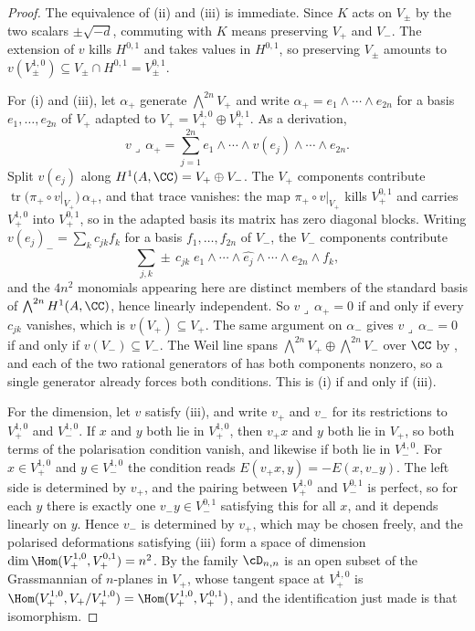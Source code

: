 \begin{proof}
The equivalence of (ii) and (iii) is immediate. Since $K$ acts on $V_{\pm}$
by the two scalars $\pm\sqrt{-d}$, commuting with $K$ means preserving $V_{+}$
and $V_{-}$. The extension of $v$ kills $H^{0,1}$ and takes values in
$H^{0,1}$, so preserving $V_{\pm}$ amounts to
$v(V_{\pm}^{1,0})\subseteq V_{\pm}\cap H^{0,1}=V_{\pm}^{0,1}$.

For (i) and (iii), let $\alpha_{+}$ generate $\bigwedge^{2n}V_{+}$ and write
$\alpha_{+}=e_{1}\wedge\cdots\wedge e_{2n}$ for a basis $e_{1},\dots,e_{2n}$
of $V_{+}$ adapted to $V_{+}=V_{+}^{1,0}\oplus V_{+}^{0,1}$. As a derivation,
\[
  v\lrcorner\,\alpha_{+}
  =\sum_{j=1}^{2n}e_{1}\wedge\cdots\wedge v(e_{j})\wedge\cdots\wedge e_{2n}.
\]
Split $v(e_{j})$ along $H^{1}(A,\CC)=V_{+}\oplus V_{-}$. The $V_{+}$
components contribute
$\operatorname{tr}\bigl(\pi_{+}\circ v|_{V_{+}}\bigr)\,\alpha_{+}$, and that
trace vanishes: the map $\pi_{+}\circ v|_{V_{+}}$ kills $V_{+}^{0,1}$ and
carries $V_{+}^{1,0}$ into $V_{+}^{0,1}$, so in the adapted basis its matrix
has zero diagonal blocks. Writing
$v(e_{j})_{-}=\sum_{k}c_{jk}f_{k}$ for a basis $f_{1},\dots,f_{2n}$ of
$V_{-}$, the $V_{-}$ components contribute
\[
  \sum_{j,k}\pm\,c_{jk}\;
  e_{1}\wedge\cdots\wedge\widehat{e_{j}}\wedge\cdots\wedge e_{2n}\wedge f_{k},
\]
and the $4n^{2}$ monomials appearing here are distinct members of the
standard basis of $\bigwedge^{2n}H^{1}(A,\CC)$, hence linearly independent.
So $v\lrcorner\,\alpha_{+}=0$ if and only if every $c_{jk}$ vanishes, which is
$v(V_{+})\subseteq V_{+}$. The same argument on $\alpha_{-}$ gives
$v\lrcorner\,\alpha_{-}=0$ if and only if $v(V_{-})\subseteq V_{-}$. The Weil
line spans $\bigwedge^{2n}V_{+}\oplus\bigwedge^{2n}V_{-}$ over $\CC$ by
, and each of the two rational generators of
 has both components nonzero, so a single generator
already forces both conditions. This is (i) if and only if (iii).

For the dimension, let $v$ satisfy (iii), and write $v_{+}$ and $v_{-}$ for
its restrictions to $V_{+}^{1,0}$ and $V_{-}^{1,0}$. If $x$ and $y$ both lie
in $V_{+}^{1,0}$, then $v_{+}x$ and $y$ both lie in $V_{+}$, so both terms of
the polarisation condition vanish, and likewise if both lie in $V_{-}^{1,0}$.
For $x\in V_{+}^{1,0}$ and $y\in V_{-}^{1,0}$ the condition reads
$E(v_{+}x,y)=-E(x,v_{-}y)$. The left side is determined by $v_{+}$, and the
pairing between $V_{+}^{1,0}$ and $V_{-}^{0,1}$ is perfect, so for each $y$
there is exactly one $v_{-}y\in V_{-}^{0,1}$ satisfying this for all $x$, and
it depends linearly on $y$. Hence $v_{-}$ is determined by $v_{+}$, which may
be chosen freely, and the polarised deformations satisfying (iii) form a
space of dimension $\dim\Hom(V_{+}^{1,0},V_{+}^{0,1})=n^{2}$. By
 the family $\cD_{n,n}$ is an open subset of the
Grassmannian of $n$-planes in $V_{+}$, whose tangent space at
$V_{+}^{1,0}$ is $\Hom(V_{+}^{1,0},V_{+}/V_{+}^{1,0})=\Hom(V_{+}^{1,0},V_{+}^{0,1})$,
and the identification just made is that isomorphism.
\end{proof}

